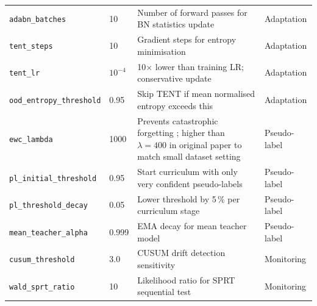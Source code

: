 \begin{longtable}{p{}p{}p{}p{}}
  \texttt{adabn\_batches}
    & 10
    & Number of forward passes for BN statistics update
      \citep{li2018adabn}
    & Adaptation \\[4pt]

  \texttt{tent\_steps}
    & 10
    & Gradient steps for entropy minimisation
      \citep{wang2021tent}
    & Adaptation \\[4pt]

  \texttt{tent\_lr}
    & $10^{-4}$
    & 10$\times$ lower than training LR; conservative update
    & Adaptation \\[4pt]

  \texttt{ood\_entropy\_threshold}
    & 0.95
    & Skip TENT if mean normalised entropy exceeds this
    & Adaptation \\[4pt]

  \texttt{ewc\_lambda}
    & 1000
    & Prevents catastrophic forgetting \citep{kirkpatrick2017overcoming};
      higher than $\lambda=400$ in original paper to match
      small dataset setting
    & Pseudo-label \\[4pt]

  \texttt{pl\_initial\_threshold}
    & 0.95
    & Start curriculum with only very confident pseudo-labels
      \citep{lee2013pseudo}
    & Pseudo-label \\[4pt]

  \texttt{pl\_threshold\_decay}
    & 0.05
    & Lower threshold by 5\,\% per curriculum stage
    & Pseudo-label \\[4pt]

  \texttt{mean\_teacher\_alpha}
    & 0.999
    & EMA decay for mean teacher model
      \citep{tarvainen2017mean}
    & Pseudo-label \\[4pt]

  \texttt{cusum\_threshold}
    & 3.0
    & CUSUM drift detection sensitivity
      \citep{page1954continuous}
    & Monitoring \\[4pt]

  \texttt{wald\_sprt\_ratio}
    & 10
    & Likelihood ratio for SPRT sequential test
      \citep{wald1947sequential}
    & Monitoring \\[4pt]

\end{longtable}
